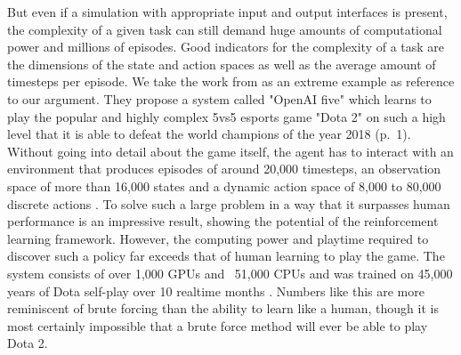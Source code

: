 \par
But even if a simulation with appropriate input and output interfaces is present, the complexity of a given task can still demand huge amounts of computational power and millions of episodes. Good indicators for the complexity of a task are the dimensions of the state and action spaces as well as the average amount of timesteps per episode. We take the work from \cite{berner2019dota} as an extreme example as reference to our argument. They propose a system called "OpenAI five" which learns to play the popular and highly complex 5vs5 esports game "Dota 2" on such a high level that it is able to defeat the world champions of the year 2018 (p.~1). Without going into detail about the game itself, the agent has to interact with an environment that produces episodes of around 20,000 timesteps, an observation space of more than 16,000 states and a dynamic action space of 8,000 to 80,000 discrete actions \cite[p.~3]{berner2019dota}. To solve such a large problem in a way that it surpasses human performance is an impressive result, showing the potential of the reinforcement learning framework. However, the computing power and playtime required to discover such a policy far exceeds that of human learning to play the game. The system consists of over 1,000 GPUs and ~51,000 CPUs \cite[p.~3]{berner2019dota} and was trained on 45,000 years of Dota self-play over 10 realtime months \cite[]{OpenAI_dota}.
Numbers like this are more reminiscent of brute forcing than the ability to learn like a human, though it is most certainly impossible that a brute force method will ever be able to play Dota 2.